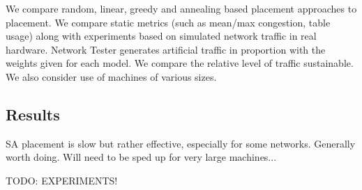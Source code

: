 			We compare random, linear, greedy and annealing based placement
			approaches to placement. We compare static metrics (such as mean/max
			congestion, table usage) along with experiments based on simulated
			network traffic in real hardware. Network Tester generates artificial
			traffic in proportion with the weights given for each model. We compare
			the relative level of traffic sustainable. We also consider use of
			machines of various sizes.
		
		\subsection{Results}
			
			SA placement is slow but rather effective, especially for some networks.
			Generally worth doing. Will need to be sped up for very large machines...
			
			TODO: EXPERIMENTS!
	
